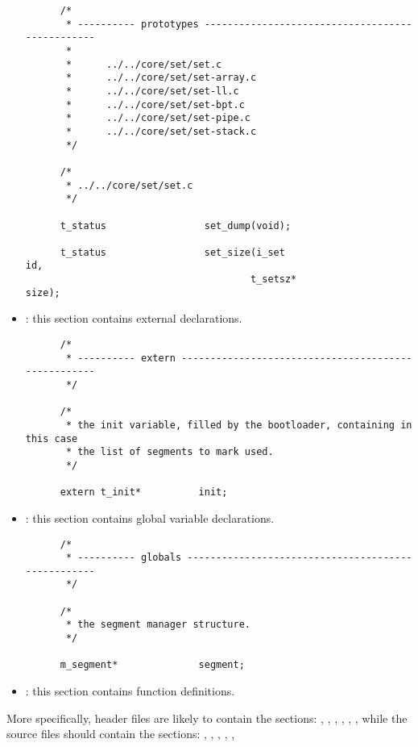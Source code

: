 \begin{itemize}
    \begin{verbatim}
      /*
       * ---------- prototypes ------------------------------------------------
       *
       *      ../../core/set/set.c
       *      ../../core/set/set-array.c
       *      ../../core/set/set-ll.c
       *      ../../core/set/set-bpt.c
       *      ../../core/set/set-pipe.c
       *      ../../core/set/set-stack.c
       */

      /*
       * ../../core/set/set.c
       */

      t_status                 set_dump(void);

      t_status                 set_size(i_set                          id,
                                       t_setsz*                       size);
    \end{verbatim}
  \item
    : this section contains external declarations.

    \begin{verbatim}
      /*
       * ---------- extern ----------------------------------------------------
       */

      /*
       * the init variable, filled by the bootloader, containing in this case
       * the list of segments to mark used.
       */

      extern t_init*          init;
    \end{verbatim}
  \item
    : this section contains global variable declarations.

    \begin{verbatim}
      /*
       * ---------- globals ---------------------------------------------------
       */

      /*
       * the segment manager structure.
       */

      m_segment*              segment;
    \end{verbatim}
  \item
    : this section contains function definitions.
\end{itemize}

More specifically,  header files are likely to contain the sections:
, , , ,
, ,  \etc{} while
the  source files should contain the sections: ,
, , , ,
 \etc{}

